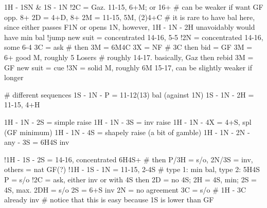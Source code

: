 1H - 1SN & 1S - 1N
!2C = Gaz. 11-15, 6+M; or 16+  # can be weaker if want GF opp. 8+
2D = 4+D, 8+
2M = 11-15, 5M, (2)4+C  # it is rare to have bal here, since either passes F1N or opens 1N, however, 1H - 1N - 2H unavoidably would have min bal
!jump new suit = concentrated 14-16, 5-5
!2N = concentrated 14-16, some 6-4
    3C = ask  # then 3M = 6M4C
    3X = NF  # 3C then bid = GF
3M = 6+ good M, roughly 5 Losers  # roughly 14-17. basically, Gaz then rebid 3M = GF
    new suit = cue
!3N = solid M, roughly 6M 15-17, can be slightly weaker if longer

# different sequences
1S - 1N - P  = 11-12(13) bal (against 1N)
1S - 1N - 2H = 11-15, 4+H

1H - 1N - 2S = simple raise
1H - 1N - 3S = inv raise
1H - 1N - 4X = 4+S, spl (GF minimum)
1H - 1N - 4S = shapely raise (a bit of gamble)
1H - 1N - 2N - any - 3S = 6H4S inv

!1H - 1S - 2S = 14-16, concentrated 6H4S+  # then P/3H = s/o, 2N/3S = inv, others = nat GF(?)
!1H - 1S - 1N = 11-15, 2-4S  # type 1: min bal, type 2: 5H4S
    P = s/o
    !2C = ask, either inv or with 4S
        then 2D = no 4S; 2H = 4S, min; 2S = 4S, max.
    2DH = s/o
    2S = 6+S inv
    2N = no agreement
    3C = s/o  # 1H - 3C already inv
# notice that this is easy because 1S is lower than GF
